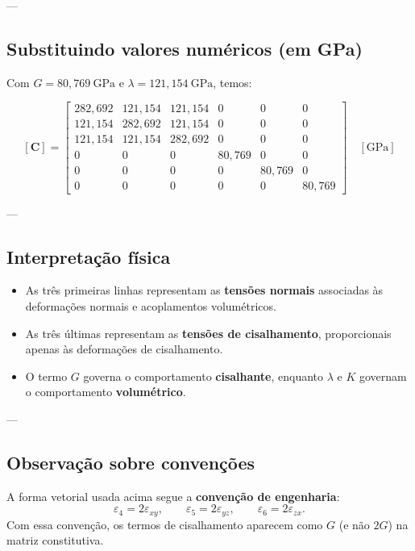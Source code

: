 ---

\subsection*{Substituindo valores numéricos (em GPa)}

Com $G = 80{,}769~\text{GPa}$ e $\lambda = 121{,}154~\text{GPa}$, temos:

\[
[\mathbf{C}] =
\begin{bmatrix}
282{,}692 & 121{,}154 & 121{,}154 & 0 & 0 & 0\\
121{,}154 & 282{,}692 & 121{,}154 & 0 & 0 & 0\\
121{,}154 & 121{,}154 & 282{,}692 & 0 & 0 & 0\\
0 & 0 & 0 & 80{,}769 & 0 & 0\\
0 & 0 & 0 & 0 & 80{,}769 & 0\\
0 & 0 & 0 & 0 & 0 & 80{,}769
\end{bmatrix}
\quad [\text{GPa}]
\]

---

\subsection*{Interpretação física}

\begin{itemize}
    \item As três primeiras linhas representam as \textbf{tensões normais} associadas às deformações normais e acoplamentos volumétricos.
    \item As três últimas representam as \textbf{tensões de cisalhamento}, proporcionais apenas às deformações de cisalhamento.
    \item O termo $G$ governa o comportamento \textbf{cisalhante}, enquanto $\lambda$ e $K$ governam o comportamento \textbf{volumétrico}.
\end{itemize}

---

\subsection*{Observação sobre convenções}

A forma vetorial usada acima segue a \textbf{convenção de engenharia}:
\[
\varepsilon_4 = 2\varepsilon_{xy}, \qquad
\varepsilon_5 = 2\varepsilon_{yz}, \qquad
\varepsilon_6 = 2\varepsilon_{zx}.
\]
Com essa convenção, os termos de cisalhamento aparecem como $G$ (e não $2G$) na matriz constitutiva.


